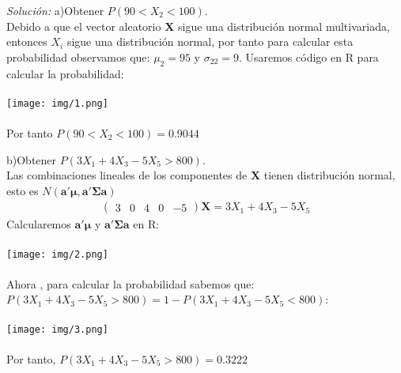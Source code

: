 \documentclass[12pt]{article}
\newenvironment{sol}
    {\emph{Solución:}
    }
    {
    }
\begin{document}
\begin{sol}a)Obtener $P(90<X_2<100)$.\\
Debido a que el vector aleatorio $\mathbf{X}$ sigue una distribución normal multivariada, entonces $X_i$ sigue una distribución normal, por tanto para calcular esta probabilidad observamos que: $\mu_2=95$ y $\sigma_{22}=9$. Usaremos código en R para calcular la probabilidad:\\ \\
\texttt{[image: img/1.png]}\\\\
Por tanto $P(90<X_2<100) = 0.9044$

\pagebreak

b)Obtener $P(3X_1+4X_3-5X_5>800)$.\\
Las combinaciones lineales de los componentes de $\mathbf{X}$ tienen distribución normal, esto es $N(\mathbf{a' \mu,a' \Sigma a})$
\begin{align*}
\begin{pmatrix}
3 & 0 & 4 & 0 & -5
\end{pmatrix} \mathbf{X} = 3X_1+4X_3-5X_5
\end{align*}
Calcularemos $\mathbf{a' \mu}$ y $\mathbf{a' \Sigma a}$ en R: \\\\
\texttt{[image: img/2.png]}\\\\
Ahora , para calcular la probabilidad sabemos que: $P(3X_1+4X_3-5X_5>800) = 1 - P(3X_1+4X_3-5X_5<800)$:\\\\
\texttt{[image: img/3.png]}\\\\
Por tanto, $P(3X_1+4X_3-5X_5>800)=0.3222$

\pagebreak


\end{sol}
\end{document}
